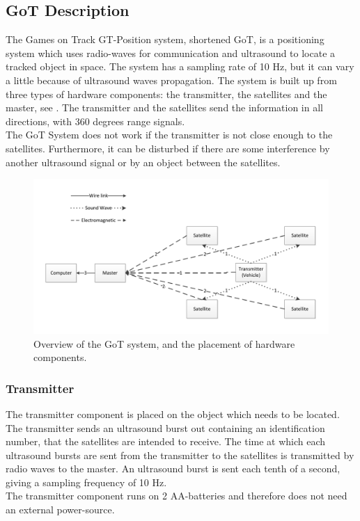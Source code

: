 \subsection{GoT Description}
\label{GoTDescription}
The Games on Track GT-Position system, shortened GoT, is a positioning system which uses radio-waves for communication and ultrasound to locate a tracked object in space. The system has a sampling rate of 10 \si{Hz}, but it can vary a little because of ultrasound waves propagation. The system is built up from three types of hardware components: the transmitter, the satellites and the master, see . The transmitter and the satellites send the information in all directions, with 360 degrees range signals.\\
The GoT System does not work if the transmitter is not close enough to the satellites. Furthermore, it can be disturbed if there are some interference by another ultrasound signal or by an object between the satellites.
%
\begin{figure}[H]
	\centering
	\includegraphics[scale=0.7]{figures/GoT_description.pdf}
	\caption{Overview of the GoT system, and the placement of hardware components.}
	\label{GoTSystem}
\end{figure}
%
\subsubsection{Transmitter}
The transmitter component is placed on the object which needs to be located. The transmitter sends an ultrasound burst out containing an identification number, that the satellites are intended to receive. The time at which each ultrasound bursts are sent from the transmitter to the satellites is transmitted by radio waves to the master. An ultrasound burst is sent each tenth of a second, giving a sampling frequency of 10 Hz.\\ 
The transmitter component runs on 2 AA-batteries and therefore does not need an external power-source.
%
